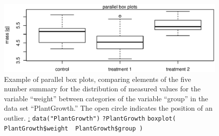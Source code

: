 %
\begin{figure}[!htb]
\begin{center}
\includegraphics[scale=0.8]{parallelBoxplots.eps}
\end{center}
\caption{Example of parallel box plots, comparing elements of
the five number summary for the distribution of measured values for
the variable ``weight'' between categories of the variable
``group'' in the \R{} data set ``PlantGrowth.'' The open
circle indicates the position of an outlier. \newline
\underline{\R:} \newline
\texttt{data("PlantGrowth")} \newline
\texttt{?PlantGrowth} \newline
\texttt{boxplot( PlantGrowth\$weight~\texttildelow~PlantGrowth\$group )}}
\end{figure}
%

%
%
%

